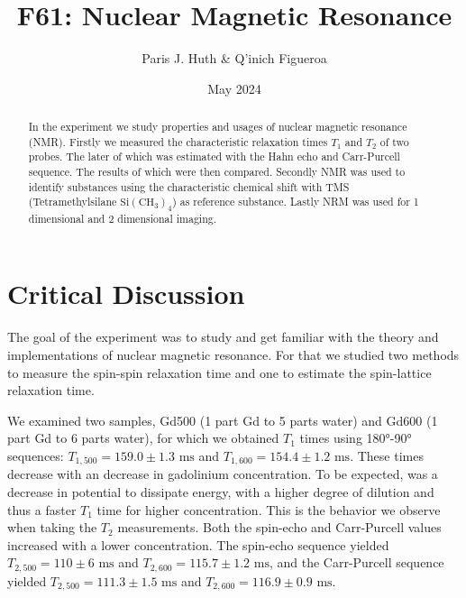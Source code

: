 \documentclass[11 pt]{article}
\title{F61: Nuclear Magnetic Resonance}
\author{Paris J. Huth \& Q'inich Figueroa}
\date{May 2024}
\begin{document}
\maketitle
\begin{center}
\begin{abstract}
In the experiment we study properties and usages of nuclear magnetic resonance (NMR). Firstly we measured the characteristic relaxation times $T_1$ and $T_2$ of two probes. The later of which was estimated with the Hahn echo and Carr-Purcell sequence. The results of which were then compared. Secondly NMR was used to identify substances using  the characteristic chemical shift with TMS (Tetramethylsilane $\mathrm{Si}\left(\mathrm{CH_3}\right)_4$) as reference substance. Lastly NRM was used for 1 dimensional and 2 dimensional imaging.  
\end{abstract}
\end{center}




\newpage
\section{Critical Discussion}
The goal of the experiment was to study and get familiar with the theory and implementations of nuclear magnetic resonance. For that we studied two methods to measure the spin-spin relaxation time and one to estimate the spin-lattice relaxation time.


	
We examined two samples, Gd500 (1 part Gd to 5 parts water) and Gd600 (1 part Gd to 6 parts water), for which we obtained $T_1$ times using 180°-90° sequences: $T_{1,500} = 159.0 ± 1.3 \text{ ms}$ and $T_{1,600} = 154.4 ± 1.2 \text{ ms}$. These times decrease with an decrease in gadolinium concentration. To be expected, was a decrease in potential to dissipate energy, with a higher degree of dilution and thus a faster $T_1$ time for higher concentration. This is the behavior we observe when taking the $T_2$ measurements. Both the spin-echo and Carr-Purcell values increased with a lower concentration. The spin-echo sequence yielded $T_{2,500} = 110 ± 6 \text{ ms}$ and $T_{2,600} = 115.7 ± 1.2 \text{ ms}$, and the Carr-Purcell sequence yielded $T_{2,500} = 111.3 ± 1.5 \text{ ms}$ and $T_{2,600} = 116.9 ± 0.9 \text{ ms}$.	
	
\end{document}
